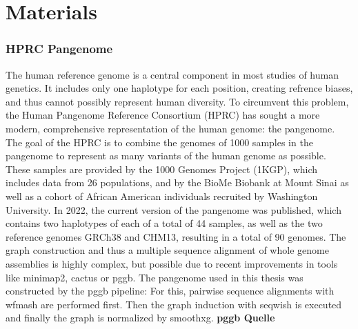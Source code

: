 \chapter{Materials}
\label{sec:materials}

\subsection{HPRC Pangenome}
The human reference genome is a central component in most studies of human genetics.\cite{wang2022human} It includes only one haplotype for each position, creating refrence biases, and thus cannot possibly represent human diversity. To circumvent this problem, the Human Pangenome Reference Consortium (HPRC) has sought a more modern, comprehensive representation of the human genome: the pangenome.
The goal of the HPRC is to combine the genomes of 1000 samples in the pangenome to represent as many variants of the human genome as possible. These samples are provided by the 1000 Genomes Project (1KGP), which includes data from 26 populations, and by the BioMe Biobank at Mount Sinai as well as a cohort of African American individuals recruited by Washington University.\cite{wang2022human}
In 2022, the current version of the pangenome was published, which contains two haplotypes of each of a total of 44 samples, as well as the two reference genomes GRCh38 and CHM13, resulting in a total of 90 genomes.
The graph construction and thus a multiple sequence alignment of whole genome assemblies is highly complex, but possible due to recent improvements in tools like minimap2, cactus or pggb. The pangenome used in this thesis was constructed by the pggb pipeline: For this, pairwise sequence alignments with wfmash are performed first. Then the graph induction with seqwish is executed and finally the graph is normalized by smoothxg. \textbf{pggb Quelle}

